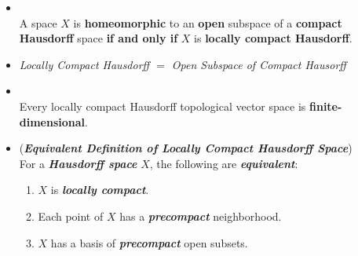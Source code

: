 \documentclass[11pt]{article}
\begin{document}
\begin{itemize}
\item \begin{corollary}  \citep{munkres2000topology} \\
A space $X$ is \textbf{homeomorphic} to an \textbf{open} subspace of a \textbf{compact Hausdorff} space \textbf{if and only if} $X$ is \textbf{locally compact Hausdorff}.
\end{corollary}

\item \begin{remark}
\emph{Locally Compact Hausdorff $=$ Open Subspace of Compact Hausorff}
 \end{remark}

 \item \begin{theorem} \citep{treves2016topological}\\
 Every locally compact Hausdorff topological vector space is \textbf{finite-dimensional}.
 \end{theorem}

\item \begin{remark} (\textbf{\emph{Equivalent Definition of Locally Compact Hausdorff Space}})\\
For a \textbf{\emph{Hausdorff space}} $X$,  the following are \textbf{\emph{equivalent}}:
\begin{enumerate}
\item $X$ is \textbf{\emph{locally compact}}.
\item Each point of $X$ has a \textbf{\emph{precompact}} neighborhood. 
\item $X$ has a basis of \textbf{\emph{precompact}} open subsets.
\end{enumerate}
\end{remark}
\end{itemize}
\end{document}

